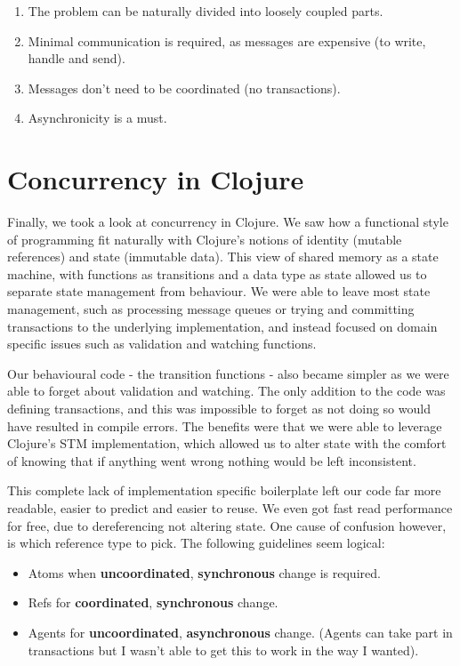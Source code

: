 \documentclass[a4paper,12pt]{kth-mag}
\begin{document}
\begin{enumerate}
\item The problem can be naturally divided into loosely coupled parts.
\item Minimal communication is required, as messages are expensive (to write, handle and send).
\item Messages don't need to be coordinated (no transactions).
\item Asynchronicity is a must.
\end{enumerate}

\section{Concurrency in Clojure}

Finally, we took a look at concurrency in Clojure. We saw how a functional style of programming fit naturally with Clojure's notions of identity (mutable references) and state (immutable data). This view of shared memory as a state machine, with functions as transitions and a data type as state allowed us to separate state management from behaviour. We were able to leave most state management, such as processing message queues or trying and committing transactions to the underlying implementation, and instead focused on domain specific issues such as validation and watching functions.

Our behavioural code - the transition functions - also became simpler as we were able to forget about validation and watching. The only addition to the code was defining transactions, and this was impossible to forget as not doing so would have resulted in compile errors. The benefits were that we were able to leverage Clojure's STM implementation, which allowed us to alter state with the comfort of knowing that if anything went wrong nothing would be left inconsistent. 

This complete lack of implementation specific boilerplate left our code far more readable, easier to predict and easier to reuse. We even got fast read performance for free, due to dereferencing not altering state. One cause of confusion however, is which reference type to pick. The following guidelines seem logical:

\begin{itemize}
\item Atoms when \textbf{uncoordinated}, \textbf{synchronous} change is required.
\item Refs for \textbf{coordinated}, \textbf{synchronous} change.
\item Agents for \textbf{uncoordinated}, \textbf{asynchronous} change. (Agents can take part in transactions but I wasn't able to get this to work in the way I wanted).
\end{itemize}
\end{document}
